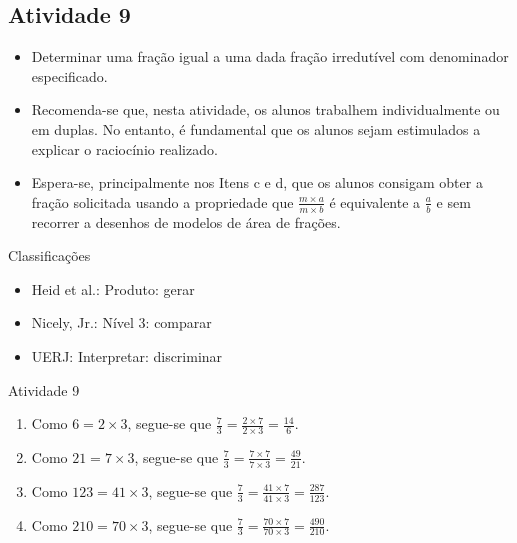 \begin{multicols}{2}
\subsection{Atividade 9}

\begin{itemize} %
    \item       Determinar uma fração igual a uma dada fração irredutível com 
denominador especificado.
\end{itemize} %
  
  
 
  
\begin{itemize} %
    \item       Recomenda-se que, nesta atividade, os alunos trabalhem 
individualmente ou em duplas. No entanto, é fundamental que os alunos sejam 
estimulados a explicar o raciocínio realizado.
    \item       Espera-se, principalmente nos Itens c e d, que os alunos 
consigam obter a fração solicitada usando a propriedade que       $\frac{m 
\times a}{m \times b}$       é equivalente a       $\frac{a}{b}$       e sem 
recorrer a desenhos de modelos de área de frações.
\end{itemize} %
  
  
  Classificações  
\begin{itemize} %
    \item       Heid et al.: Produto: gerar
    \item       Nicely, Jr.: Nível 3: comparar
    \item       UERJ: Interpretar: discriminar
\end{itemize} %


\begin{resposta*}{Atividade 9}
\begin{enumerate} [\quad a)] %
    \item       Como       $6 = 2 \times 3$, segue-se que       $\frac{7}{3} = 
\frac{2 \times 7}{2 \times 3} = \frac{14}{6}$.
    \item       Como       $21 = 7 \times 3$, segue-se que       $\frac{7}{3} = 
\frac{7 \times 7}{7 \times 3} = \frac{49}{21}$.
    \item       Como       $123 = 41 \times 3$, segue-se que       $\frac{7}{3} 
= \frac{41 \times 7}{41 \times 3} = \frac{287}{123}$.
    \item       Como       $210 = 70 \times 3$, segue-se que       $\frac{7}{3} 
= \frac{70 \times 7}{70 \times 3} = \frac{490}{210}$.
\end{enumerate} %
\end{resposta*}


\end{multicols}
